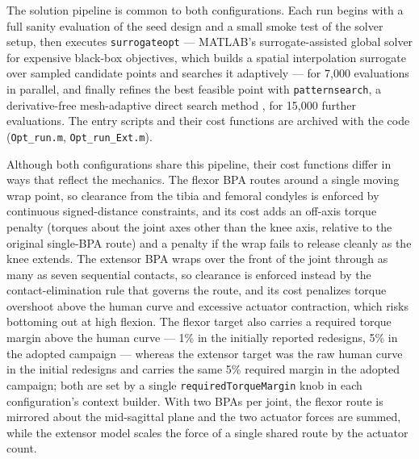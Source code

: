 The solution pipeline is common to both configurations. Each run begins with a full sanity evaluation of the seed design and a small smoke test of the solver setup, then executes \texttt{surrogateopt} --- MATLAB's surrogate-assisted global solver for expensive black-box objectives, which builds a spatial interpolation surrogate over sampled candidate points and searches it adaptively \citep{mathworks_optimization_2025} --- for 7,000 evaluations in parallel, and finally refines the best feasible point with \texttt{patternsearch}, a derivative-free mesh-adaptive direct search method \citep{audet_mads_2006, mathworks_optimization_2025}, for 15,000 further evaluations. The entry scripts and their cost functions are archived with the code (\texttt{Opt\_run.m}, \texttt{Opt\_run\_Ext.m}).

Although both configurations share this pipeline, their cost functions differ in ways that reflect the mechanics. The flexor BPA routes around a single moving wrap point, so clearance from the tibia and femoral condyles is enforced by continuous signed-distance constraints, and its cost adds an off-axis torque penalty (torques about the joint axes other than the knee axis, relative to the original single-BPA route) and a penalty if the wrap fails to release cleanly as the knee extends. The extensor BPA wraps over the front of the joint through as many as seven sequential contacts, so clearance is enforced instead by the contact-elimination rule that governs the route, and its cost penalizes torque overshoot above the human curve and excessive actuator contraction, which risks bottoming out at high flexion. The flexor target also carries a required torque margin above the human curve --- 1\% in the initially reported redesigns, 5\% in the adopted campaign --- whereas the extensor target was the raw human curve in the initial redesigns and carries the same 5\% required margin in the adopted campaign; both are set by a single \texttt{requiredTorqueMargin} knob in each configuration's context builder. With two BPAs per joint, the flexor route is mirrored about the mid-sagittal plane and the two actuator forces are summed, while the extensor model scales the force of a single shared route by the actuator count.


